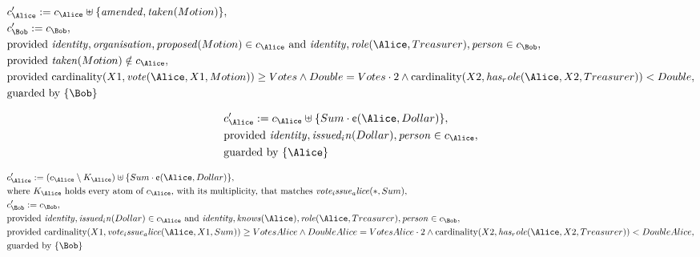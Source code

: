 \begin{align*}
&
c'_
{
\Alice
}
 := 
c_
{
\Alice
}
 \uplus 
\{
\mathit{
amended
}
,
\mathit{
taken
}
(
Motion
)
\}
,\\
&
c'_
{
\Bob
}
 := 
c_
{
\Bob
}
,\\
&
\text{provided } 
\mathit{
identity
}
,
\mathit{
organisation
}
,
\mathit{
proposed
}
(
Motion
)
 \in c_
{
\Alice
}
 \text{ and } 
\mathit{
identity
}
,
\mathit{
role
}
(
\Alice
,
Treasurer
)
,
\mathit{
person
}
 \in c_
{
\Bob
}
,\\
&
\text{provided } 
\mathit{
taken
}
(
Motion
)
 \notin c_
{
\Alice
}
,\\
&
\text{provided } 
\mathrm{cardinality}(
X1
,
\mathit{
vote
}
(
\Alice
,
X1
,
Motion
)
)
\ge
Votes
\land
Double
=
Votes
\cdot
2
\land
\mathrm{cardinality}(
X2
,
\mathit{
has_role
}
(
\Alice
,
X2
,
Treasurer
)
)
<
Double
,\\
&
\text{guarded by } \{
\Bob
\}
\end{align*}

\begin{align*}
&
c'_
{
\Alice
}
 := 
c_
{
\Alice
}
 \uplus 
\{
Sum
\cdot
\text{\textcent}
(
\Alice
,
Dollar
)
\}
,\\
&
\text{provided } 
\mathit{
identity
}
,
\mathit{
issued_in
}
(
Dollar
)
,
\mathit{
person
}
 \in c_
{
\Alice
}
,\\
&
\text{guarded by } \{
\Alice
\}
\end{align*}

\begin{align*}
&
c'_
{
\Alice
}
 := 
(
c_
{
\Alice
}
 \setminus K_
{
\Alice
}
) \uplus 
\{
Sum
\cdot
\text{\textcent}
(
\Alice
,
Dollar
)
\}
,\\
&
\text{where } K_
{
\Alice
}
 \text{ holds every atom of } c_
{
\Alice
}
 \text{, with its multiplicity, that matches } 
\mathit{
vote_issue_alice
}
(
\ast
,
Sum
)
,\\
&
c'_
{
\Bob
}
 := 
c_
{
\Bob
}
,\\
&
\text{provided } 
\mathit{
identity
}
,
\mathit{
issued_in
}
(
Dollar
)
 \in c_
{
\Alice
}
 \text{ and } 
\mathit{
identity
}
,
\mathit{
knows
}
(
\Alice
)
,
\mathit{
role
}
(
\Alice
,
Treasurer
)
,
\mathit{
person
}
 \in c_
{
\Bob
}
,\\
&
\text{provided } 
\mathrm{cardinality}(
X1
,
\mathit{
vote_issue_alice
}
(
\Alice
,
X1
,
Sum
)
)
\ge
VotesAlice
\land
DoubleAlice
=
VotesAlice
\cdot
2
\land
\mathrm{cardinality}(
X2
,
\mathit{
has_role
}
(
\Alice
,
X2
,
Treasurer
)
)
<
DoubleAlice
,\\
&
\text{guarded by } \{
\Bob
\}
\end{align*}
